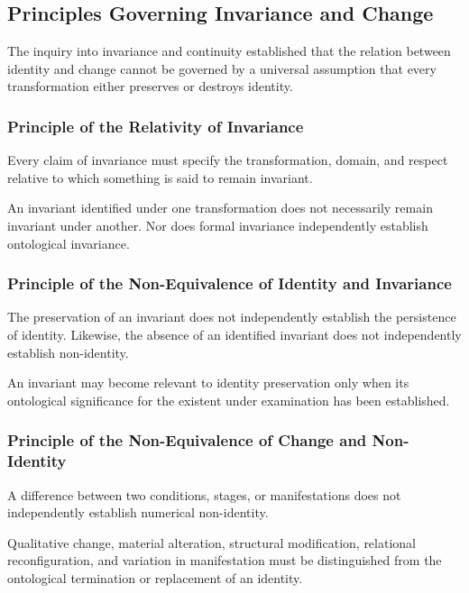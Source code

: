 
\subsection{Principles Governing Invariance and Change}

The inquiry into invariance and continuity established
that the relation between identity and change cannot
be governed by a universal assumption that every
transformation either preserves or destroys identity.

\subsubsection{Principle of the Relativity of Invariance}

Every claim of invariance must specify the transformation,
domain, and respect relative to which something is said
to remain invariant.

An invariant identified under one transformation does
not necessarily remain invariant under another. Nor
does formal invariance independently establish ontological
invariance.

\subsubsection{Principle of the Non-Equivalence of Identity and Invariance}

The preservation of an invariant does not independently
establish the persistence of identity. Likewise, the
absence of an identified invariant does not independently
establish non-identity.

An invariant may become relevant to identity preservation
only when its ontological significance for the existent
under examination has been established.

\subsubsection{Principle of the Non-Equivalence of Change and Non-Identity}

A difference between two conditions, stages, or
manifestations does not independently establish numerical
non-identity.

Qualitative change, material alteration, structural
modification, relational reconfiguration, and variation
in manifestation must be distinguished from the
ontological termination or replacement of an identity.

